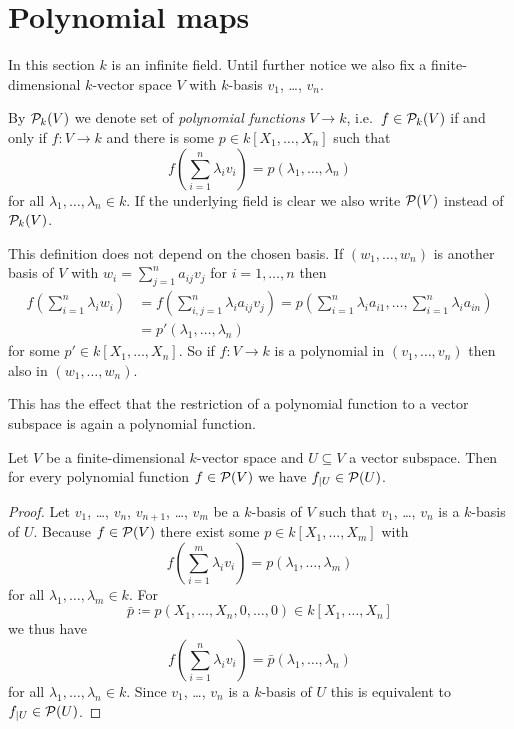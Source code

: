 




\section{Polynomial maps}


In this section $k$ is an infinite field.
Until further notice we also fix a finite-dimensional $k$-vector space $V$ with $k$-basis $v_1$, \dots, $v_n$.


\begin{defi}
  By $\mathcal{P}_k(V)$ we denote set of \emph{polynomial functions} $V \to k$, i.e.\ $f \in \mathcal{P}_k(V)$ if and only if $f \colon V \to k$ and there is some $p \in k[X_1, \dotsc, X_n]$ such that
  \[
      f\left( \sum_{i=1}^n \lambda_i v_i \right)
    = p(\lambda_1, \dotsc, \lambda_n)
  \]
  for all $\lambda_1, \dotsc, \lambda_n \in k$.
  If the underlying field is clear we also write $\mathcal{P}(V)$ instead of $\mathcal{P}_k(V)$.
\end{defi}


This definition does not depend on the chosen basis.
If $(w_1, \dotsc, w_n)$ is another basis of $V$ with $w_i = \sum_{j=1}^n a_{ij} v_j$ for $i = 1, \dotsc, n$ then
\begin{align*}
      f\left( \sum_{i=1}^n \lambda_i w_i \right)
  &=  f\left( \sum_{i,j=1}^n \lambda_i a_{ij} v_j \right)
   =  p\left( \sum_{i=1}^n \lambda_i a_{i1}, \dotsc, \sum_{i=1}^n \lambda_{i} a_{in} \right)  \\
  &=  p'(\lambda_1, \dotsc, \lambda_n)
\end{align*}
for some $p' \in k[X_1, \dotsc, X_n]$.
So if $f \colon V \to k$ is a polynomial in $(v_1, \dotsc, v_n)$ then also in $(w_1, \dotsc, w_n)$.

This has the effect that the restriction of a polynomial function to a vector subspace is again a polynomial function.

\begin{lem}
  Let $V$ be a finite-dimensional $k$-vector space and $U \subseteq V$ a vector subspace.
  Then for every polynomial function $f \in \mathcal{P}(V)$ we have $f_{|U} \in \mathcal{P}(U)$.
\end{lem}
\begin{proof}
  Let $v_1$, \dots, $v_n$, $v_{n+1}$, \dots, $v_m$ be a $k$-basis of $V$ such that $v_1$, \dots, $v_n$ is a $k$-basis of $U$.
  Because $f \in \mathcal{P}(V)$ there exist some $p \in k[X_1, \dotsc, X_m]$ with
  \[
      f\left( \sum_{i=1}^m \lambda_i v_i \right)
    = p(\lambda_1, \dotsc, \lambda_m)
  \]
  for all $\lambda_1, \dotsc, \lambda_m \in k$. For
  \[
              \bar{p}
    \coloneqq p(X_1, \dotsc, X_n, 0, \dotsc, 0)
    \in       k[X_1, \dotsc, X_n]
  \]
  we thus have
  \[
      f\left( \sum_{i=1}^n \lambda_i v_i \right)
    = \bar{p}(\lambda_1, \dotsc, \lambda_n)
  \]
  for all $\lambda_1, \dotsc, \lambda_n \in k$.
  Since $v_1$, \dots, $v_n$ is a $k$-basis of $U$ this is equivalent to $f_{|U} \in \mathcal{P}(U)$.
\end{proof}


